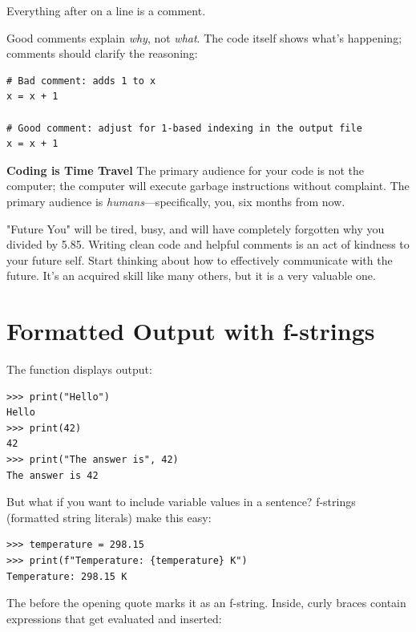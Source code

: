 Everything after \py{#} on a line is a comment.

\begin{tip}
Good comments explain \emph{why}, not \emph{what}. The code itself shows what's happening; comments should clarify the reasoning:

\begin{lstlisting}
# Bad comment: adds 1 to x
x = x + 1

# Good comment: adjust for 1-based indexing in the output file
x = x + 1
\end{lstlisting}
\end{tip}

\begin{ponder}
\textbf{Coding is Time Travel}
The primary audience for your code is not the computer; the computer will execute garbage instructions without complaint. The primary audience is \emph{humans}---specifically, you, six months from now.

"Future You" will be tired, busy, and will have completely forgotten why you divided by 5.85. Writing clean code and helpful comments is an act of kindness to your future self. Start thinking about how to effectively communicate with the future. It's an acquired skill like many others, but it is a very valuable one.
\end{ponder}

\section{Formatted Output with f-strings}
\label{sec:fstrings}

The  function displays output:

\begin{lstlisting}
>>> print("Hello")
Hello
>>> print(42)
42
>>> print("The answer is", 42)
The answer is 42
\end{lstlisting}

But what if you want to include variable values in a sentence? f-strings (formatted string literals) make this easy:

\begin{lstlisting}
>>> temperature = 298.15
>>> print(f"Temperature: {temperature} K")
Temperature: 298.15 K
\end{lstlisting}

The  before the opening quote marks it as an f-string. Inside, curly braces \py{\{\}} contain expressions that get evaluated and inserted:

